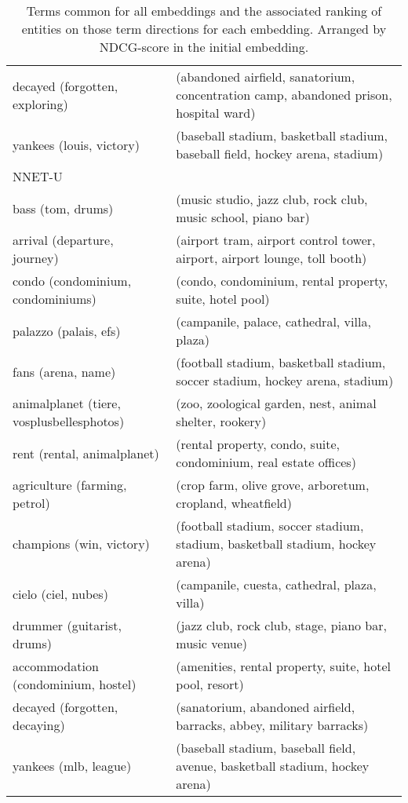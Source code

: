 \begin{table}[]
\begin{tabular}{ll}
		decayed (forgotten, exploring)             & (abandoned airfield, sanatorium, concentration camp, abandoned prison, hospital ward)  \\
		yankees (louis, victory)                   & (baseball stadium, basketball stadium, baseball field, hockey arena, stadium)          \\
		NNET-U                                     &                                                                                        \\
		bass (tom, drums)                          & (music studio, jazz club, rock club, music school, piano bar)                          \\
		arrival (departure, journey)               & (airport tram, airport control tower, airport, airport lounge, toll booth)             \\
		condo (condominium, condominiums)          & (condo, condominium, rental property, suite, hotel pool)                               \\
		palazzo (palais, efs)                      & (campanile, palace, cathedral, villa, plaza)                                           \\
		fans (arena, name)                         & (football stadium, basketball stadium, soccer stadium, hockey arena, stadium)          \\
		animalplanet (tiere, vosplusbellesphotos)  & (zoo, zoological garden, nest, animal shelter, rookery)                                \\
		rent (rental, animalplanet)                & (rental property, condo, suite, condominium, real estate offices)                      \\
		agriculture (farming, petrol)              & (crop farm, olive grove, arboretum, cropland, wheatfield)                              \\
		champions (win, victory)                   & (football stadium, soccer stadium, stadium, basketball stadium, hockey arena)          \\
		cielo (ciel, nubes)                        & (campanile, cuesta, cathedral, plaza, villa)                                           \\
		drummer (guitarist, drums)                 & (jazz club, rock club, stage, piano bar, music venue)                                  \\
		accommodation (condominium, hostel)        & (amenities, rental property, suite, hotel pool, resort)                                \\
		decayed (forgotten, decaying)              & (sanatorium, abandoned airfield, barracks, abbey, military barracks)                   \\
		yankees (mlb, league)                      & (baseball stadium, baseball field, avenue, basketball stadium, hockey arena)          
	\end{tabular}\caption{Terms common for all embeddings and the associated ranking of entities on those term directions for each embedding. Arranged by NDCG-score in the initial embedding.}
\end{table}

